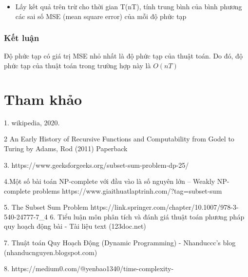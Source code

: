 \documentclass{article}
\begin{document}
\begin{itemize}
    \item Lấy kết quả trên trừ cho thời gian T(nT), tính trung bình của bình phương các sai số MSE (mean square error) của mỗi độ phức tạp
    \begin{table}[H]
\end{table}
\end{itemize}


\subsubsection{Kết luận}

Độ phức tạp có giá trị MSE nhỏ nhất là độ phức tạp của thuật toán. Do đó, độ phức tạp của thuật toán trong trường hợp này là $O(nT)$


\section{Tham khảo}
1. wikipedia, 2020.

2  An Early History of Recursive Functions and Computability from Godel to Turing by Adams, Rod (2011) Paperback 

3. https://www.geeksforgeeks.org/subset-sum-problem-dp-25/

4.Một số bài toán NP-complete với đầu vào là số nguyên lớn -- Weakly NP-complete problems https://www.giaithuatlaptrinh.com/?tag=subset-sum

5. The Subset Sum Problem https://link.springer.com/chapter/10.1007/978-3-540-24777-7_4
6. Tiểu luận môn phân tích và đánh giá thuật toán phương pháp quy hoạch động bài - Tài liệu text (123doc.net)

7. Thuật toán Quy Hoạch Động (Dynamic Programming) - Nhanduccc's blog (nhanducnguyen.blogspot.com)

8. https://medium0.com/@yenbao1340/time-complexity-%
\end{document}
